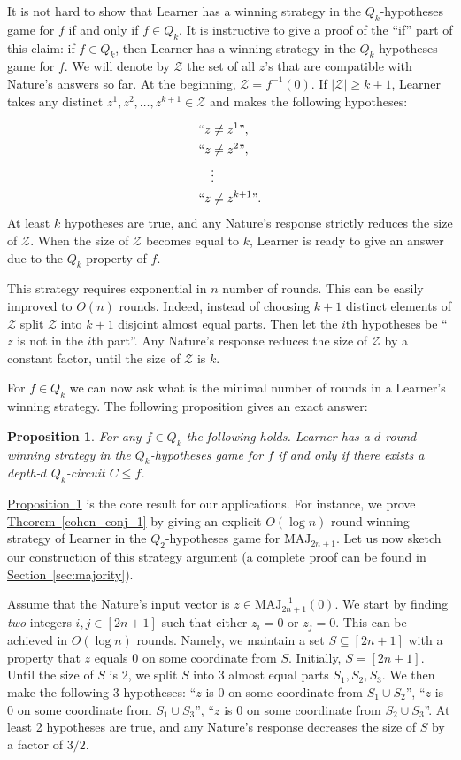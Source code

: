 \documentclass[11pt]{article}
\numberwithin{equation}{section}
\newtheorem{proposition}[theorem]{Proposition}
\theoremstyle{definition}
\theoremstyle{plain}
\newcommand{\expref}[2]{\hyperref[#2]{#1~\ref{#2}}}
\def\MAJ{\mathrm{MAJ}}
\begin{document}
It is not hard to show that Learner has a winning strategy in the $Q_k$-hypotheses game for $f$ if and only if $f\in Q_k$. It is instructive to give a proof of the ``if'' part of this claim: if $f\in Q_k$, then Learner has a winning strategy in the $Q_k$-hypotheses game for $f$. We will denote by $\mathcal{Z}$ the set of all $z$'s that are compatible with Nature's answers so far. At the beginning, $\mathcal{Z} = f^{-1}(0)$. If $|\mathcal{Z}| \ge k + 1$, Learner takes any distinct $z^1, z^2, \ldots, z^{k + 1} \in \mathcal{Z}$ and makes the following hypotheses:

\begin{align*}
``z&\neq z^1\mbox{''}, \\
``z&\neq z^2\mbox{''}, \\
&\vdots \\
``z&\neq z^{k + 1}\mbox{''}.
\end{align*}
At least $k$ hypotheses are true, and any Nature's response strictly reduces the size of $\mathcal{Z}$. When the size of $\mathcal{Z}$ becomes equal to $k$, Learner is ready to give an answer due to the $Q_k$-property of $f$.

This strategy requires exponential in $n$ number of rounds. This can be easily improved to $O(n)$ rounds. Indeed, instead of choosing $k + 1$ distinct elements of $\mathcal{Z}$ split $\mathcal{Z}$ into $k + 1$ disjoint almost equal parts. Then let the $i$th hypotheses be ``$z$ is not in the $i$th part''. Any Nature's response reduces the size of $\mathcal{Z}$ by a constant factor, until the size of $\mathcal{Z}$ is $k$.

For $f\in Q_k$ we can now ask what is the minimal number of rounds in a Learner's winning strategy. The following proposition gives an exact answer:
\begin{proposition}
\label{games_Q_k}
For any $f\in Q_k$ the following holds. Learner has a $d$-round winning strategy in the $Q_k$-hypotheses game for $f$ if and only if there exists a
depth-$d$ $Q_k$-circuit $C\le f$.
\end{proposition}

\expref{Proposition}{games_Q_k} is the core result for our applications. For instance, we prove \expref{Theorem}{cohen_conj_1} by giving an explicit $O(\log n)$-round winning strategy of Learner in the $Q_2$-hypotheses game for $\MAJ_{2n + 1}$. Let us now sketch our construction of this strategy argument (a complete proof can be found in \expref{Section}{sec:majority}).

Assume that the Nature's input vector is $z\in\MAJ_{2n + 1}^{-1}(0)$. We start by finding \emph{two} integers $i, j \in [2n + 1]$ such that either $z_i = 0$ or $z_j = 0$. This can be achieved in $O(\log n)$ rounds. Namely, we maintain a set $S\subseteq [2n + 1]$ with a property that $z$ equals $0$ on some coordinate from $S$. Initially, $S = [2n + 1]$. Until the size of $S$ is 2, we split $S$ into 3 almost equal parts $S_1, S_2, S_3$. We then make the following 3 hypotheses: ``$z$ is $0$ on some coordinate from $S_1\cup S_2$'', ``$z$ is $0$ on some coordinate from $S_1\cup S_3$'', ``$z$ is $0$ on some coordinate from $S_2\cup S_3$''. At least 2 hypotheses are true, and any Nature's response decreases the size of $S$ by a factor of $3/2$.
\end{document}

